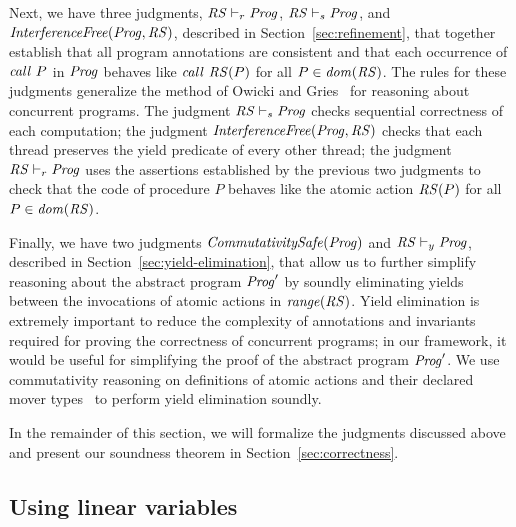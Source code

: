 Next, we have three judgments, $\mathit{RS} \vdash_r \mathit{Prog}$, $\mathit{RS} \vdash_s \mathit{Prog}$, and $\mathit{InterferenceFree}(\mathit{Prog}, \mathit{RS})$,
described in Section~\ref{sec:refinement},
that together establish that all program annotations are consistent and that 
each occurrence of $\mathit{call}\ P$ in $\mathit{Prog}$ behaves like $\mathit{call}\ \mathit{RS}(P)$ 
for all $P \in \mathit{dom}(\mathit{RS})$.
The rules for these judgments generalize the method of Owicki and Gries~\cite{OwickiG76} for reasoning about concurrent programs.
The judgment $\mathit{RS} \vdash_s \mathit{Prog}$ checks sequential correctness of each computation;
the judgment $\mathit{InterferenceFree}(\mathit{Prog}, \mathit{RS})$ checks that each thread preserves the
yield predicate of every other thread;
the judgment $\mathit{RS} \vdash_r \mathit{Prog}$ uses the assertions established by the previous two judgments to check that 
the code of procedure $P$ behaves like the atomic action $\mathit{RS}(P)$ for all $P\in\mathit{dom}(\mathit{RS})$.

Finally, we have two judgments $\mathit{CommutativitySafe}(\mathit{Prog})$ and $\mathit{RS} \vdash_y \mathit{Prog}$, 
described in Section~\ref{sec:yield-elimination}, that allow us to further simplify reasoning 
about the abstract program $\mathit{Prog}'$ by soundly eliminating yields between the invocations of atomic actions in $\mathit{range}(\mathit{RS})$.
Yield elimination is extremely important to reduce the complexity of annotations and invariants 
required for proving the correctness of concurrent programs;
in our framework, it would be useful for simplifying the proof of the abstract program $\mathit{Prog}'$.
We use commutativity reasoning on definitions of atomic actions and their declared mover types~\cite{FlanaganFLQ08,ElmasQT09}
to perform yield elimination soundly.

In the remainder of this section, we will formalize the judgments discussed above
and present our soundness theorem in Section~\ref{sec:correctness}.

\subsection{Using linear variables}
\label{sec:linearity}

